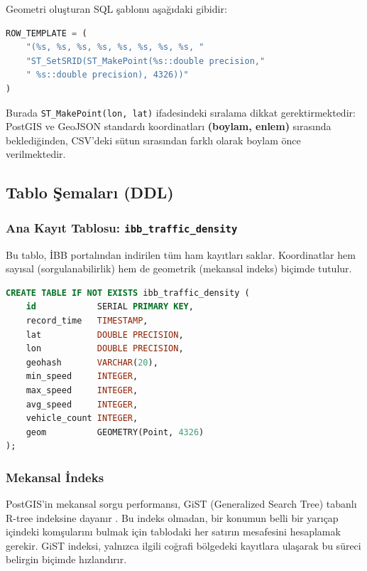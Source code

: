 \documentclass[12pt,a4paper]{article}
\begin{document}
Geometri oluşturan SQL şablonu aşağıdaki gibidir:

\begin{lstlisting}[language=Python, caption={Geometri oluşturma şablonu}]
ROW_TEMPLATE = (
    "(%s, %s, %s, %s, %s, %s, %s, %s, "
    "ST_SetSRID(ST_MakePoint(%s::double precision,"
    " %s::double precision), 4326))"
)
\end{lstlisting}

Burada \texttt{ST\_MakePoint(lon, lat)} ifadesindeki sıralama dikkat gerektirmektedir: PostGIS ve GeoJSON standardı koordinatları \textbf{(boylam, enlem)} sırasında beklediğinden, CSV'deki sütun sırasından farklı olarak boylam önce verilmektedir.

\subsection{Tablo Şemaları (DDL)}

\subsubsection{Ana Kayıt Tablosu: \texttt{ibb\_traffic\_density}}

Bu tablo, İBB portalından indirilen tüm ham kayıtları saklar. Koordinatlar hem sayısal (sorgulanabilirlik) hem de geometrik (mekansal indeks) biçimde tutulur.

\begin{lstlisting}[language=SQL, caption={Ana veri tablosu DDL}]
CREATE TABLE IF NOT EXISTS ibb_traffic_density (
    id            SERIAL PRIMARY KEY,
    record_time   TIMESTAMP,
    lat           DOUBLE PRECISION,
    lon           DOUBLE PRECISION,
    geohash       VARCHAR(20),
    min_speed     INTEGER,
    max_speed     INTEGER,
    avg_speed     INTEGER,
    vehicle_count INTEGER,
    geom          GEOMETRY(Point, 4326)
);
\end{lstlisting}

\subsubsection{Mekansal İndeks}

PostGIS'in mekansal sorgu performansı, GiST (Generalized Search Tree) tabanlı R-tree indeksine dayanır \cite{crunchy-postgis}. Bu indeks olmadan, bir konumun belli bir yarıçap içindeki komşularını bulmak için tablodaki her satırın mesafesini hesaplamak gerekir. GiST indeksi, yalnızca ilgili coğrafi bölgedeki kayıtlara ulaşarak bu süreci belirgin biçimde hızlandırır.
\end{document}
